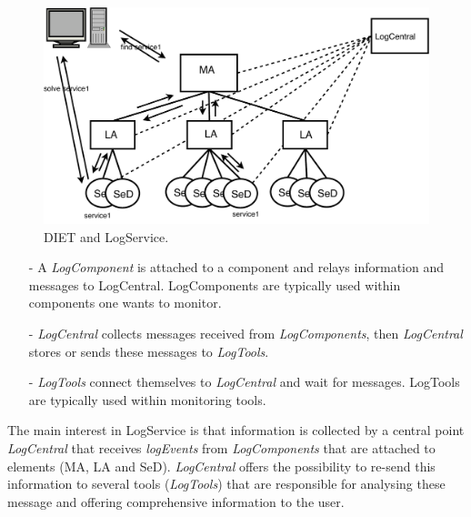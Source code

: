  \begin{figure}[h!]
  \begin{center}
    \includegraphics[scale=0.6]{fig/DIET_arch_request-2}
    \caption{DIET and LogService.}
    \label{fig:DIET_LogService}
  \end{center}
\end{figure}

\begin{itemize}
 \item[-] A \textit{LogComponent} is attached to a component and relays
   information and messages to LogCentral.  LogComponents are typically used
   within components one wants to monitor.
 \item[-] \textit{LogCentral} collects messages received from
   \textit{LogComponents}, then \textit{LogCentral} stores or sends these
   messages to \textit{LogTools}.
 \item[-] \textit{LogTools} connect themselves to \textit{LogCentral} and  wait
   for messages.  LogTools are typically used within monitoring tools.
\end{itemize}
The main interest in LogService is that information is collected by a central
point \textit{LogCentral} that receives \textit{logEvents} from
\textit{LogComponents} that are attached to \diet elements (MA, LA and
SeD). \textit{LogCentral} offers the possibility to re-send this information to
several tools (\textit{LogTools}) that are responsible for analysing these
message and offering comprehensive information to the user.\\

